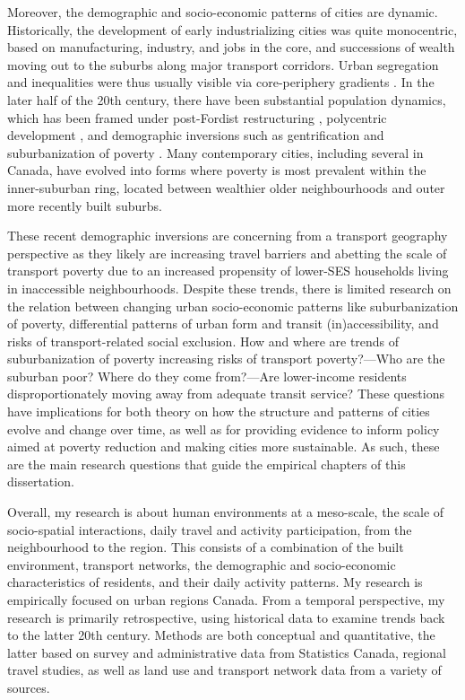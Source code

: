 Moreover, the demographic and socio-economic patterns of cities are dynamic. Historically, the development of early industrializing cities was quite monocentric, based on manufacturing, industry, and jobs in the core, and successions of wealth moving out to the suburbs along major transport corridors. Urban segregation and inequalities were thus usually visible via core-periphery gradients \cite{burgess_growth_1925,alonso_location_1964,glaeser_sprawl_2004}. In the later half of the 20th century, there have been substantial population dynamics, which has been framed under post-Fordist restructuring \cite{walks_social_2001}, polycentric development \cite{anas_urban_1998}, and demographic inversions \cite{ehrenhalt_great_2012} such as gentrification \cite{vigdor_does_2002} and suburbanization of poverty \cite{ades_are_2012}. Many contemporary cities, including several in Canada, have evolved into forms where poverty is most prevalent within the inner-suburban ring, located between wealthier older neighbourhoods and outer more recently built suburbs.


These recent demographic inversions are concerning from a transport geography perspective as they likely are increasing travel barriers and abetting the scale of transport poverty due to an increased propensity of lower-SES households living in inaccessible neighbourhoods. Despite these trends, there is limited research on the relation between changing urban socio-economic patterns like suburbanization of poverty, differential patterns of urban form and transit (in)accessibility, and risks of transport-related social exclusion. How and where are trends of suburbanization of poverty increasing risks of transport poverty?---Who are the suburban poor? Where do they come from?---Are lower-income residents disproportionately moving away from adequate transit service? These questions have implications for both theory on how the structure and patterns of cities evolve and change over time, as well as for providing evidence to inform policy aimed at poverty reduction and making cities more sustainable. As such, these are the main research questions that guide the empirical chapters of this dissertation.

Overall, my research is about human environments at a meso-scale, the scale of socio-spatial interactions, daily travel and activity participation, from the neighbourhood to the region. This consists of a combination of the built environment, transport networks, the demographic and socio-economic characteristics of residents, and their daily activity patterns. My research is empirically focused on urban regions Canada. From a temporal perspective, my research is primarily retrospective, using historical data to examine trends back to the latter 20th century. Methods are both conceptual and quantitative, the latter based on survey and administrative data from Statistics Canada, regional travel studies, as well as land use and transport network data from a variety of sources. 

